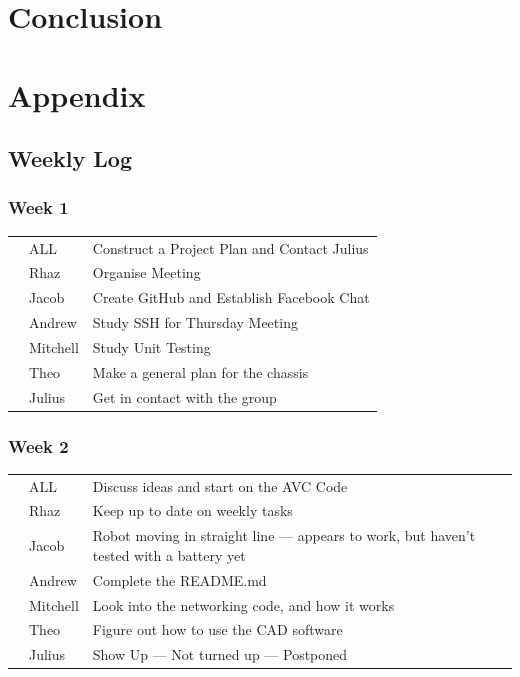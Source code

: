 \documentclass[paper=a4, fontsize=11pt]{scrartcl} %
\def\checkmark{\tikz\fill[scale=0.4] (0,.35) -- (.25,0) -- (1,.7) -- (.25,.15) -- cycle;}
\def\scalecheck{\resizebox{\widthof{\checkmark}*\ratio{\widthof{x}}{\widthof{\normalsize x}}}{!}{\checkmark}}
\numberwithin{equation}{section} %
\numberwithin{figure}{section} %
\begin{document}
\section{Conclusion}

\printbibliography{}

\section{Appendix}

\subsection{Weekly Log}

\subsubsection*{Week 1}
\begin{tabularx}{\textwidth}{clX}
  \scalecheck & ALL      & Construct a Project Plan and Contact Julius\\
  \scalecheck & Rhaz     & Organise Meeting\\
  \scalecheck & Jacob    & Create GitHub and Establish Facebook Chat\\
  \scalecheck & Andrew   & Study SSH for Thursday Meeting\\
  \scalecheck & Mitchell & Study Unit Testing\\
  \scalecheck & Theo     & Make a general plan for the chassis\\
  \scalecheck & Julius   & Get in contact with the group
\end{tabularx}

\subsubsection*{Week 2}
\begin{tabularx}{\textwidth}{clX}
  \scalecheck  & ALL      & Discuss ideas and start on the AVC Code\\
  \scalecheck  & Rhaz     & Keep up to date on weekly tasks\\
               & Jacob    & Robot moving in straight line --- appears to work, but haven't tested with a battery yet\\
  \scalecheck  & Andrew   & Complete the README.md\\
  \scalecheck  & Mitchell & Look into the networking code, and how it works\\
  \scalecheck  & Theo     & Figure out how to use the CAD software\\
               & Julius   & Show Up --- Not turned up --- Postponed\\
\end{tabularx}
\end{document}
